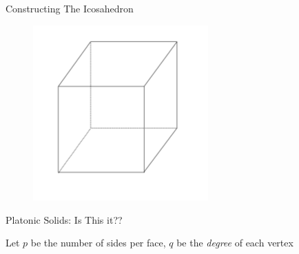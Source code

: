 \documentclass{beamer}
\begin{document}
\begin{frame}{Constructing The Icosahedron}

\begin{figure}[t]
    \includegraphics[width=0.6\textwidth]{CubeConstruct.pdf}
\end{figure}

\end{frame}

\begin{frame}{Platonic Solids: Is This it??}

Let $p$ be the number of sides per face, $q$ be the {\em degree} of each vertex





\end{frame}
\end{document}
